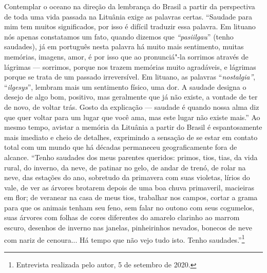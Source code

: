 Contemplar o oceano na direção da lembrança do Brasil a partir da
perspectiva de toda uma vida passada na Lituânia exige as palavras
certas. ``Saudade para mim tem muitos significados, por isso é difícil
traduzir essa palavra. Em lituano nós apenas constatamos um fato, quando
dizemos que \emph{``pasiilgau}'' (tenho saudades), já em português nesta
palavra há muito mais sentimento, muitas memórias, imagens, amor, é por
isso que ao pronunciá"-la sorrimos através de lágrimas --- sorrimos,
porque nos trazem memórias muito agradáveis, e lágrimas porque se trata
de um passado irreversível. Em lituano, as palavras
``\emph{nostalgia''}, ``\emph{ilgesys}'', lembram mais um sentimento
físico, uma dor. A saudade designa o desejo de algo bom, positivo, mas
geralmente que já não existe, a vontade de ter de novo, de voltar trás.
Gosto da explicação --- saudade é quando nossa alma diz que quer voltar
para um lugar que você ama, mas este lugar não existe mais.'' Ao mesmo
tempo, avistar a memória da Lituânia a partir do Brasil é espantosamente
mais imediato e cheio de detalhes, exprimindo a sensação de se estar em
contato total com um mundo que há décadas permaneceu geograficamente
fora de alcance. ``Tenho saudades dos meus parentes queridos: primos,
tios, tias, da vida rural, do inverno, da neve, de patinar no gelo, de
andar de trenó, de rolar na neve, das estações do ano, sobretudo da
primavera com suas violetas, lírios do vale, de ver as árvores brotarem
depois de uma boa chuva primaveril, macieiras em flor; de veranear na
casa de meus tios, trabalhar nos campos, cortar a grama para que os
animais tenham seu feno, sem falar no outono com seus cogumelos, suas
árvores com folhas de cores diferentes do amarelo clarinho ao marrom
escuro, desenhos de inverno nas janelas, pinheirinhos nevados, bonecos
de neve com nariz de cenoura... Há tempo que não vejo tudo isto. Tenho
saudades.''\footnote{Entrevista realizada pelo autor, 5 de setembro de
  2020.}

